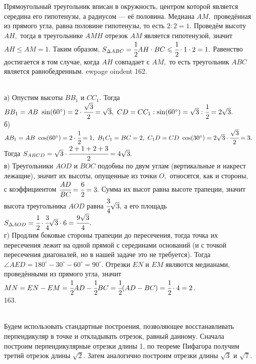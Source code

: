 Прямоугольный треугольник вписан в окружность, центром которой является середина его гипотенузы, а радиусом --- её половина. Медиана $AM,$ проведённая из прямого угла, равна половине гипотенузы, то есть $2:2=1.$ Проведём высоту $AH,$ тогда в треугольнике $AMH$ отрезок $AM$ является гипотенузой, значит $AH\leqslant AM=1.$ Таким образом, $S_{\Delta ABC}=\cfrac{1}{2}AH\cdot BC \leqslant \cfrac{1}{2}\cdot 1 \cdot 2=1.$ Равенство достигается в том случае, когда $AH$ совпадает с $AM,$ то есть треугольник $ABC$ является равнобедренным.
ewpage
oindent
162. \begin{figure}[ht!]
\end{figure}\\
а) Опустим высоты $BB_1$ и $CC_1.$ Тогда $BB_1=AB\ \sin(60^\circ)=2\cdot \cfrac{\sqrt{3}}{2}=\sqrt{3},\ CD=CC_1:\sin(60^\circ)=\sqrt{3}:\cfrac{1}{2}=2\sqrt{3}.$\\
б) $AB_1=AB\ \cos(60^\circ)=2 \cdot \cfrac{1}{2}=1,\ B_1C_1=BC=2,\ C_1D=CD\ \cos(30^\circ)=2\sqrt{3}\cdot \cfrac{\sqrt{3}}{2}=3.$ Тогда $S_{ABCD}=\sqrt{3}\cdot\cfrac{2+1+2+3}{2}=4\sqrt{3}.$\\
в) Треугольники $AOD$ и $BOC$ подобны по двум углам (вертикальные и накрест лежащие), значит их высоты, опущенные из точки $O,$ относятся, как и стороны, с коэффициентом $\cfrac{AD}{BC}=\cfrac{6}{2}=3.$ Сумма их высот равна высоте трапеции, значит высота треугольника $AOD$ равна $\cfrac{3}{4}\sqrt{3},$ а его площадь $S_{\Delta AOD}=\cfrac{1}{2}\cdot\cfrac{3}{4}\sqrt{3}\cdot6=\cfrac{9\sqrt{3}}{4}.$\\
г) Продлим боковые стороны трапеции до пересечения, тогда точка их пересечения лежит на одной прямой с серединами оснований (и с точкой пересечения диагоналей, но в нашей задаче это не требуется). Тогда $\angle AED=180^\circ-30^\circ-60^\circ=90^\circ.$ Отрезки $EN$ и $EM$ являются медианами, проведёнными из прямого угла, значит $MN=EN-EM=\cfrac{1}{2}AD-\cfrac{1}{2}BC=\cfrac{1}{2}(AD-BC)=\cfrac{1}{2}\cdot4=2$.\\
163. \begin{figure}[ht!]
\end{figure}\\
Будем использовать стандартные построения, позволяющее восстанавливать перпендикуляр в точке и откладывать отрезок, равный данному. Сначала построим перпендикулярные отрезки длины 1, по теореме Пифагора получим третий отрезок длины $\sqrt{2}.$ Затем аналогично построим отрезки длины $\sqrt{3}$ и $\sqrt{7}.$
